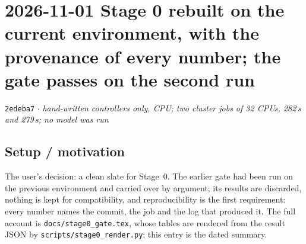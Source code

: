 \documentclass[11pt,a4paper]{article}
\newcommand{\commit}[1]{\texttt{\textcolor{commitgray}{#1}}}
\begin{document}
\section*{2026-11-01 \quad Stage 0 rebuilt on the current environment, with
the provenance of every number; the gate passes on the second run}

\commit{2edeba7} $\cdot$ \textit{hand-written controllers only, CPU; two
cluster jobs of 32 CPUs, 282\,s and 279\,s; no model was run}

\subsection*{Setup / motivation}

The user's decision: a clean slate for Stage~0. The earlier gate had been run
on the previous environment and carried over by argument; its results are
discarded, nothing is kept for compatibility, and reproducibility is the
first requirement: every number names the commit, the job and the log that
produced it. The full account is \texttt{docs/stage0\_gate.tex}, whose
tables are rendered from the result JSON by
\texttt{scripts/stage0\_render.py}; this entry is the dated summary.
\end{document}
